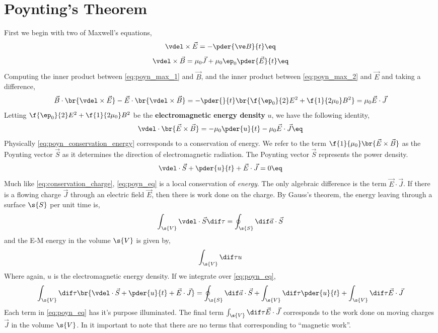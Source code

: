 \documentclass{article}
\begin{document}
\section{Poynting's Theorem}
First we begin with two of Maxwell's equations,
\[ \vdel \times \vec{E} = - \pder{\ve B}{t} \eq \label{eq:poyn_max_1}\]
\[ \vdel \times \vec{B} = \mu_0 \vec{J} + \mu_0 \ep_0 \pder{\vec{E}}{t} \eq \label{eq:poyn_max_2}\]
Computing the inner product between \cref{eq:poyn_max_1} and $\vec{B}$, and the inner product between \cref{eq:poyn_max_2} and $\vec{E}$ and taking a difference,
\[ \vec{B} \cdot \br{\vdel \times \vec{E}} - \vec{E} \cdot \br{\vdel \times \vec{B}} = - \pder{}{t}\br{\f{\ep_0}{2} E^2 + \f{1}{2 \mu_0} B^2} = \mu_0 \vec{E} \cdot \vec{J}\]
Letting $\f{\ep_0}{2} E^2 + \f{1}{2 \mu_0} B^2$ be the \textbf{electromagnetic energy density} $u$, we have the following identity,
\[ \vdel\cdot\br{\vec{E} \times \vec{B}} = - \mu_0 \pder{u}{t} - \mu_0 \vec{E} \cdot \vec{J} \eq \label{eq:poyn_conservation_energy} \]
Physically \cref{eq:poyn_conservation_energy} corresponds to a conservation of energy. We refer to the term $\f{1}{\mu_0} \br{\vec{E} \times \vec{B}}$ as the Poynting vector $\vec{S}$ as it determines the direction of electromagnetic radiation. The Poynting vector $\vec{S}$ represents the power density.
\[ \vdel \cdot \vec{S} + \pder{u}{t} + \vec{E} \cdot \vec{J} = 0 \eq \label{eq:poyn_eq}\]
Much like \cref{eq:conservation_charge}, \cref{eq:poyn_eq} is a local conservation of \textit{energy}. The only algebraic difference is the term $\vec{E} \cdot \vec{J}$. If there is a flowing charge $\vec{J}$ through an electric field $\vec{E}$, then there is work done on the charge. By Gauss's theorem, the energy leaving through a surface $\s{S}$ per unit time is,
\[ \int_{\s{V}} \vdel \cdot \vec{S} \dif \tau =  \oint_{\s{S}} \dif \vec{a}\cdot \vec{S} \]
and the E-M energy in the volume $\s{V}$ is given by,
\[ \int_{\s{V}} \dif \tau u \]
Where again, $u$ is the electromagnetic energy density. If we integrate over \cref{eq:poyn_eq},
\[\int_{\s{V}} \dif \tau \br{\vdel \cdot \vec{S} +\pder{u}{t} + \vec{E} \cdot \vec{J}} = \oint_{\s{S}} \dif \vec{a}\cdot \vec{S} + \int_{\s{V}} \dif \tau \pder{u}{t} + \int_{\s{V}} \dif \tau \vec{E} \cdot \vec{J} \]
Each term in \cref{eq:poyn_eq} has it's purpose illuminated. The final term $\int_{\s{V}} \dif \tau \vec{E} \cdot \vec{J}$ corresponds to the work done on moving charges $\vec{J}$ in the volume $\s{V}$. In it important to note that there are no terms that corresponding to ``magnetic work''. \\
\end{document}

